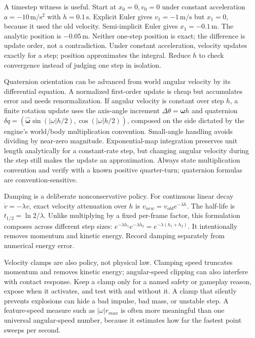 A timestep witness is useful. Start at \(x_0=0,v_0=0\) under constant acceleration \(a=-10\,\mathrm{m/s^2}\) with \(h=0.1\,\mathrm s\). Explicit Euler gives \(v_1=-1\,\mathrm{m/s}\) but \(x_1=0\), because it used the old velocity. Semi-implicit Euler gives \(x_1=-0.1\,\mathrm m\). The analytic position is \(-0.05\,\mathrm m\). Neither one-step position is exact; the difference is update order, not a contradiction. Under constant acceleration, velocity updates exactly for a step; position approximates the integral. Reduce \(h\) to check convergence instead of judging one step in isolation.

Quaternion orientation can be advanced from world angular velocity by its differential equation. A normalized first-order update is cheap but accumulates error and needs renormalization. If angular velocity is constant over step \(h\), a finite rotation update uses the axis-angle increment \(\Delta\theta=\boldsymbol\omega h\) and quaternion \(\delta q=(\hat{\boldsymbol\omega}\sin(|\omega|h/2),\cos(|\omega|h/2))\), composed on the side dictated by the engine's world/body multiplication convention. Small-angle handling avoids dividing by near-zero magnitude. Exponential-map integration preserves unit length analytically for a constant-rate step, but changing angular velocity during the step still makes the update an approximation. Always state multiplication convention and verify with a known positive quarter-turn; quaternion formulas are convention-sensitive.

Damping is a deliberate nonconservative policy. For continuous linear decay \(\dot v=-\lambda v\), exact velocity attenuation over \(h\) is \(v_{new}=v_{old}e^{-\lambda h}\). The half-life is \(t_{1/2}=\ln2/\lambda\). Unlike multiplying by a fixed per-frame factor, this formulation composes across different step sizes: \(e^{-\lambda h_1}e^{-\lambda h_2}=e^{-\lambda(h_1+h_2)}\). It intentionally removes momentum and kinetic energy. Record damping separately from numerical energy error.

Velocity clamps are also policy, not physical law. Clamping speed truncates momentum and removes kinetic energy; angular-speed clipping can also interfere with contact response. Keep a clamp only for a named safety or gameplay reason, expose when it activates, and test with and without it. A clamp that silently prevents explosions can hide a bad impulse, bad mass, or unstable step. A feature-speed measure such as \(|\omega|r_{max}\) is often more meaningful than one universal angular-speed number, because it estimates how far the fastest point sweeps per second.

